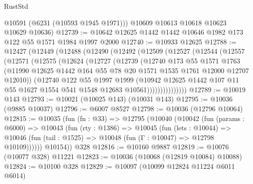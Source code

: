 \begin{lexlean}{RustStd}
\begin{coremodule}
{{        @10591
        (@6231 (@10593 @1945 @1971)))
      @10609
      @10613
      @10618
      @10623
      @10629
      @10636)
@12739 := @10642 @12625 @1442 @1442 @10646 @1982 @173 @122 @55 @1571 @1984 @1997 @2000
@12740 := @10933 @12625
@12788 := @12427
    (@12449
      (@12488
        (@12490
          (@12492
            (@12509
              (@12527
                (@12544
                  (@12557
                    (@12571
                      (@12575
                        (@12624
                          (@12727
                            (@12739
                              (@12740
                                @173
                                @55
                                @1571
                                @1763
                                (@11990
                                  @12625
                                  @1442
                                  @164
                                  @55
                                  @78
                                  @20
                                  @1571
                                  @1535
                                  @1761
                                  @12000
                                  @12707
                                  @12010))
                              (@12740
                                @122
                                @55
                                @1997
                                @1999
                                (@10942
                                  @12625
                                  @1442
                                  @107
                                  @11
                                  @55
                                  @1627
                                  @1554
                                  @541
                                  @1548
                                  @12683
                                  @10561)))))))))))))))
@12789 := @10019 @143
@12793 := @10021 (@10025 @143) (@10031 @143)
@12795 := @10036 (@9885 @10037)
@12796 := @6007 @8527
@12798 := @10036 (@12796 @10064)
@12815 := @10035
    (fun (fn : @33) =>
    @12795
      (@10040
        (@10042
          (fun (params : @6000) =>
          @10043
            (fun (rty : @1386) =>
            @10045
              (fun (lets : @10044) =>
              @10046 (fun (tail : @1525) => @10048 (fun (Γ : @10047) => @12798 @10109))))))
        @10154))
    @328
@12816 := @10160 @9887
@12819 := @10076 (@10077 @328) @11221
@12823 := @10036 (@10068 (@12819 @10084) @10088)
@12824 := @10100 @328
@12829 := @10097 (@10099 @12824 @11224 @6011 @6014)
}}
\end{coremodule}
\end{lexlean}
